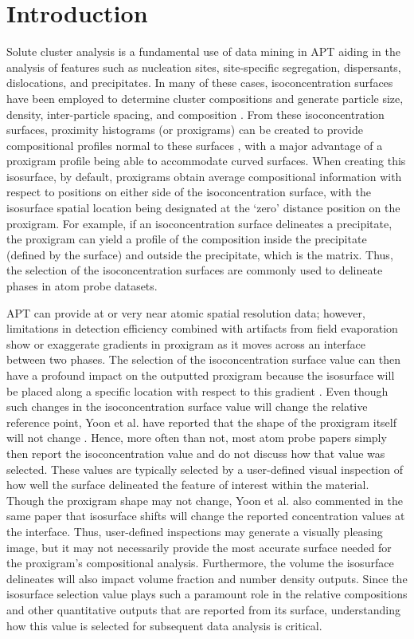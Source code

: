 \section*{Introduction}
	Solute cluster analysis is a fundamental use of data mining in APT aiding in the analysis of features such as nucleation sites, site-specific segregation, dispersants, dislocations, and precipitates. In many of these cases, isoconcentration surfaces have been employed to determine cluster compositions and generate particle size, density, inter-particle spacing, and composition \cite{RN410,RN740,RN2685}. From these isoconcentration surfaces, proximity histograms (or proxigrams) can be created to provide compositional profiles normal to these surfaces \cite{RN1686,RN1009,RN2679}, with a major advantage of a proxigram profile being able to accommodate curved surfaces. When creating this isosurface, by default, proxigrams obtain average compositional information with respect to positions on either side of the isoconcentration surface, with the isosurface spatial location being designated at the ‘zero’ distance position on the proxigram. For example, if an isoconcentration surface delineates a precipitate, the proxigram can yield a profile of the composition inside the precipitate (defined by the surface) and outside the precipitate, which is the matrix. Thus, the selection of the isoconcentration surfaces are commonly used to delineate phases in atom probe datasets. 
	
	APT can provide at or very near atomic spatial resolution data; however, limitations in detection efficiency combined with artifacts from field evaporation show or exaggerate gradients in proxigram as it moves across an interface between two phases. The selection of the isoconcentration surface value can then have a profound impact on the outputted proxigram because the isosurface will be placed along a specific location with respect to this gradient \cite{RN371,RN2603}. Even though such changes in the isoconcentration surface value will change the relative reference point, Yoon et al. have reported that the shape of the proxigram itself will not change \cite{RN683}. Hence, more often than not, most atom probe papers simply then report the isoconcentration value and do not discuss how that value was selected. These values are typically selected by a user-defined visual inspection of how well the surface delineated the feature of interest within the material. Though the proxigram shape may not change, Yoon et al. also commented in the same paper that isosurface shifts will change the reported concentration values at the interface. Thus, user-defined inspections may generate a visually pleasing image, but it may not necessarily provide the most accurate surface needed for the proxigram’s compositional analysis. Furthermore, the volume the isosurface delineates will also impact volume fraction and number density outputs. Since the isosurface selection value plays such a paramount role in the relative compositions and other quantitative outputs that are reported from its surface, understanding how this value is selected for subsequent data analysis is critical. 
	
